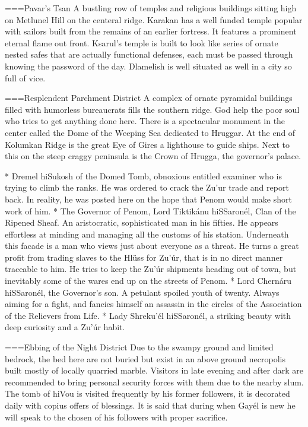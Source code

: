 ===Pavar's Tsan
A bustling row of temples and religious buildings sitting high on Metlunel Hill on the centeral ridge. Karakan has a well funded temple popular with sailors built from the remains of an earlier fortress. It features a prominent eternal flame out front. Ksarul's temple is built to look like series of ornate nested safes that are actually functional defenses, each must be passed through knowing the password of the day. Dlamelish is well situated as well in a city so full of vice.

===Resplendent Parchment District
A complex of ornate pyramidal buildings filled with humorless bureaucrats fills the southern ridge. God help the poor soul who tries to get anything done here. There is a spectacular monument in the center called the Dome of the Weeping Sea dedicated to Hruggar. At the end of Kolumkan Ridge is the great Eye of Gires a lighthouse to guide ships. Next to this on the steep craggy peninsula is the Crown of Hrugga, the governor's palace.

* Dremel hiSukosh of the Domed Tomb, obnoxious entitled examiner who is trying to climb the ranks. He was ordered to crack the Zu'ur trade and report back. In reality, he was posted here on the hope that Penom would make short work of him.
* The Governor of Penom, Lord Tiktikánu hiSSaronél, Clan of the Ripened Sheaf. An aristocratic, sophisticated man in his fifties. He appears effortless at minding and managing all the customs of his station. Underneath this facade is a man who views just about everyone as a threat. He turns a great profit from trading slaves to the Hlüss for Zu'úr, that is in no direct manner traceable to him. He tries to keep the Zu'úr shipments heading out of town, but inevitably some of the wares end up on the streets of Penom.
* Lord Chernáru hiSSaronél, the Governor's son. A petulant spoiled youth of twenty. Always aiming for a fight, and fancies himself an assassin in the circles of the Association of the Relievers from Life.
* Lady Shreku'él hiSSaronél, a striking beauty with deep curiosity and a Zu'úr habit.

===Ebbing of the Night District
Due to the swampy ground and limited bedrock, the bed here are not buried but exist in an above ground necropolis built mostly of locally quarried marble. Visitors in late evening and after dark are recommended to bring personal security forces with them due to the nearby slum. The tomb of hiVou is visited frequently by his former followers, it is decorated daily with copius offers of blessings. It is said that during when Gayél is new he will speak to the chosen of his followers with proper sacrifice.

